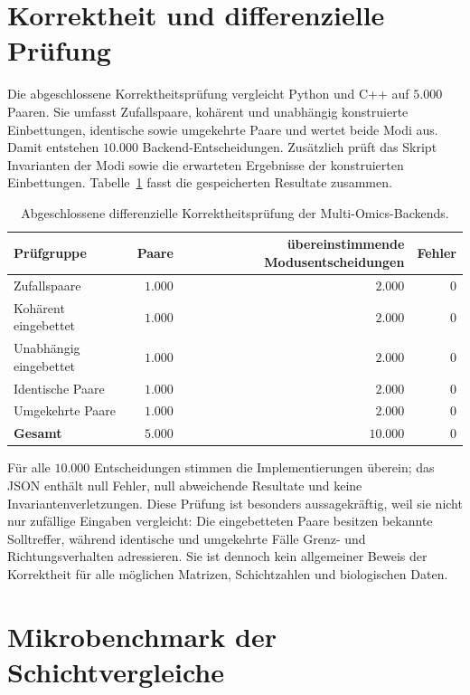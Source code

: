 \documentclass[a4paper,12pt, twoside]{report}
\theoremstyle{definition}
\begin{document}
\section{Korrektheit und differenzielle Prüfung}
\label{sec:multiomics_correctness}

Die abgeschlossene Korrektheitsprüfung vergleicht Python und C++ auf $5.000$ Paaren. Sie umfasst Zufallspaare, kohärent und unabhängig konstruierte Einbettungen, identische sowie umgekehrte Paare und wertet beide Modi aus. Damit entstehen $10.000$ Backend-Entscheidungen. Zusätzlich prüft das Skript Invarianten der Modi sowie die erwarteten Ergebnisse der konstruierten Einbettungen. Tabelle~\ref{tab:multiomics_correctness} fasst die gespeicherten Resultate zusammen.

\begin{table}[!h]
\centering
\small
\caption{Abgeschlossene differenzielle Korrektheitsprüfung der Multi-Omics-Backends.}
\label{tab:multiomics_correctness}
\begin{tabular}{@{}lrrr@{}}
\toprule
Prüfgruppe & Paare & übereinstimmende Modusentscheidungen & Fehler \\
\midrule
Zufallspaare & $1.000$ & $2.000$ & $0$ \\
Kohärent eingebettet & $1.000$ & $2.000$ & $0$ \\
Unabhängig eingebettet & $1.000$ & $2.000$ & $0$ \\
Identische Paare & $1.000$ & $2.000$ & $0$ \\
Umgekehrte Paare & $1.000$ & $2.000$ & $0$ \\
\midrule
\textbf{Gesamt} & $5.000$ & $10.000$ & $0$ \\
\bottomrule
\end{tabular}
\end{table}

Für alle $10.000$ Entscheidungen stimmen die Implementierungen überein; das JSON enthält null Fehler, null abweichende Resultate und keine Invariantenverletzungen. Diese Prüfung ist besonders aussagekräftig, weil sie nicht nur zufällige Eingaben vergleicht: Die eingebetteten Paare besitzen bekannte Solltreffer, während identische und umgekehrte Fälle Grenz- und Richtungsverhalten adressieren. Sie ist dennoch kein allgemeiner Beweis der Korrektheit für alle möglichen Matrizen, Schichtzahlen und biologischen Daten.

\section{Mikrobenchmark der Schichtvergleiche}
\label{sec:multiomics_micro}
\end{document}
